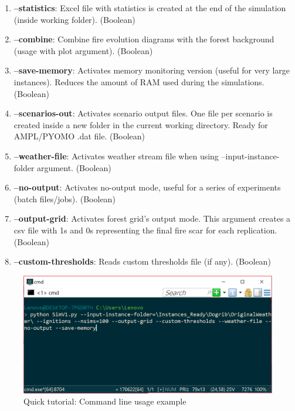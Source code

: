 \documentclass[11pt]{article}
\begin{document}
\begin{enumerate}
\item \textbf{--statistics}: Excel file with statistics is created at the end of the simulation (inside working folder). \hfill (Boolean)
 
\item \textbf{--combine}: Combine fire evolution diagrams with the forest background (usage with plot argument). \hfill (Boolean)

\item \textbf{--save-memory}: Activates memory monitoring version (useful for very large instances). Reduces the amount of RAM used during the simulations. \hfill (Boolean)

\item \textbf{--scenarios-out}: Activates scenario output files. One file per scenario is created inside a new folder in the current working directory. Ready for AMPL/PYOMO .dat file. \hfill (Boolean)

\item \textbf{--weather-file}: Activates weather stream file when using --input-instance-folder argument. \hfill (Boolean)

\item \textbf{--no-output}: Activates no-output mode, useful for a series of experiments (batch files/jobs). \hfill (Boolean)

\item \textbf{--output-grid}: Activates forest grid's output mode. This argument creates a csv file with 1s and 0s representing the final fire scar for each replication. \hfill (Boolean)

\item \textbf{--custom-thresholds}: Reads custom thresholds file (if any). \hfill (Boolean)

\end{enumerate}

\begin{figure}[h!]
\centering
\includegraphics[scale=0.6]{Tutorial17.png}
\caption{\label{fig:Tut17} Quick tutorial: Command line usage example}
\end{figure}
\end{document}
